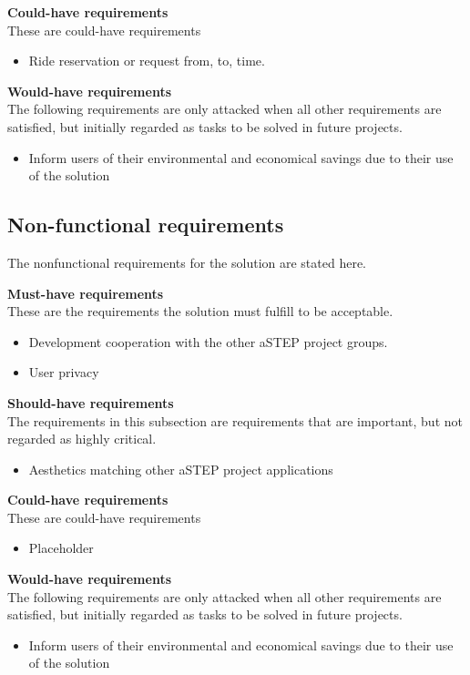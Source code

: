 \textbf{Could-have requirements}\\
These are could-have requirements
\begin{itemize}
	\item Ride reservation or request from, to, time.
\end{itemize}

\textbf{Would-have requirements}\\
The following requirements are only attacked when all other requirements are satisfied, but initially regarded as tasks to be solved in future projects.
\begin{itemize}
	\item Inform users of their environmental and economical savings due to their use of the solution
\end{itemize}

\subsection{Non-functional requirements}
The nonfunctional requirements for the solution are stated here.

\textbf{Must-have requirements}\\
These are the requirements the solution must fulfill to be acceptable.
\begin{itemize}
	\item Development cooperation with the other aSTEP project groups.
	\item User privacy
\end{itemize}

\textbf{Should-have requirements}\\
The requirements in this subsection are requirements that are important, but not regarded as highly critical.
\begin{itemize}
	\item Aesthetics matching other aSTEP project applications
\end{itemize}

\textbf{Could-have requirements}\\
These are could-have requirements
\begin{itemize}
	\item Placeholder
\end{itemize}

\textbf{Would-have requirements}\\
The following requirements are only attacked when all other requirements are satisfied, but initially regarded as tasks to be solved in future projects.
\begin{itemize}
	\item Inform users of their environmental and economical savings due to their use of the solution
\end{itemize}
